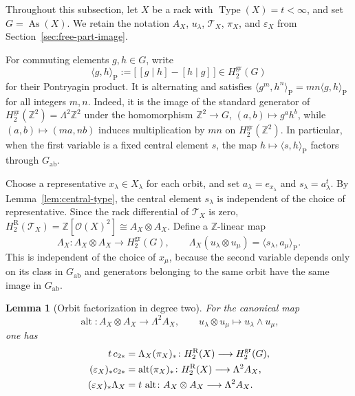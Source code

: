 \documentclass[10pt,a4paper]{amsart}
\newtheorem{lemma}[theorem]{Lemma}
\DeclareMathOperator{\As}{As}
\DeclareMathOperator{\Type}{Type}
\newcommand{\ZZ}{\mathbb Z}
\newcommand{\OO}{\mathcal O}
\newcommand{\gr}{\mathrm{gr}}
\newcommand{\R}{\mathrm R}
\newcommand{\ab}{\mathrm{ab}}
\begin{document}
Throughout this subsection, let $X$ be a rack with
$\Type(X)=t<\infty$, and set $G=\As(X)$. We retain the notation
$A_X$, $u_\lambda$, $\mathcal T_X$, $\pi_X$, and $\varepsilon_X$ from
Section~\ref{sec:free-part-image}.

For commuting elements $g,h\in G$, write
\begin{equation}
 \langle g,h\rangle_{\mathrm P}
 :=\bigl[\,[g\mid h]-[h\mid g] \,\bigr]
 \in H_2^{\gr}(G)
 \label{eq:Pontryagin-class}
\end{equation}
for their Pontryagin product. It is alternating and satisfies
$\langle g^m,h^n\rangle_{\mathrm P}=mn\langle g,h\rangle_{\mathrm P}$ for
all integers $m,n$. Indeed, it is the image of the standard generator of
$H_2^{\gr}(\ZZ^2)=\Lambda^2\ZZ^2$ under the homomorphism
$\ZZ^2\to G$, $(a,b)\mapsto g^ah^b$, while
$(a,b)\mapsto(ma,nb)$ induces multiplication by $mn$ on
$H_2^{\gr}(\ZZ^2)$. In particular, when the first variable is a fixed central
element $s$, the map $h\mapsto\langle s,h\rangle_{\mathrm P}$ factors through
$G_{\ab}$.

Choose a representative $x_\lambda\in X_\lambda$ for each orbit, and set
$a_\lambda=e_{x_\lambda}$ and $s_\lambda=a_\lambda^t$. By
Lemma~\ref{lem:central-type}, the central element $s_\lambda$ is independent
of the choice of representative. Since the rack differential of
$\mathcal T_X$ is zero,
$H_2^\R(\mathcal T_X)=\ZZ[\OO(X)^2]\cong A_X\otimes A_X$. Define a
$\ZZ$-linear map
\[
\Lambda_X\colon A_X\otimes A_X\longrightarrow H_2^{\gr}(G),
 \qquad
 \Lambda_X(u_\lambda\otimes u_\mu)
 =\langle s_\lambda,a_\mu\rangle_{\mathrm P}.
\]
This is independent of the choice of $x_\mu$, because the second variable
depends only on its class in $G_{\ab}$ and generators belonging to the same
orbit have the same image in $G_{\ab}$.

\begin{lemma}[Orbit factorization in degree two]
\label{lem:degree-two-orbit-factorization}
For the canonical map
\[
 \operatorname{alt}\colon A_X\otimes A_X\longrightarrow\Lambda^2A_X,
 \qquad u_\lambda\otimes u_\mu\longmapsto u_\lambda\wedge u_\mu,
\]
one has
\begin{align}
 t\,c_{2*}&=\Lambda_X(\pi_X)_*
 \colon H_2^\R(X)\longrightarrow H_2^{\gr}(G),\notag\\
 (\varepsilon_X)_*c_{2*}&=\operatorname{alt}(\pi_X)_*
 \colon H_2^\R(X)\longrightarrow\Lambda^2A_X,
 \label{eq:epsilon-c2-alt}\\
 (\varepsilon_X)_*\Lambda_X&=t\,\operatorname{alt}
 \colon A_X\otimes A_X\longrightarrow\Lambda^2A_X.
 \label{eq:epsilon-Lambda-alt}
\end{align}
\end{lemma}
\end{document}
